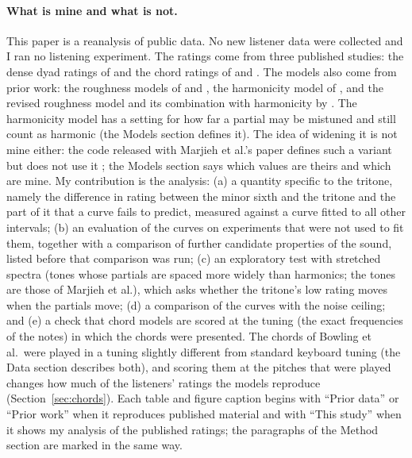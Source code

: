 \documentclass[11pt,a4paper]{article}
\begin{document}
\paragraph{What is mine and what is not.}
This paper is a reanalysis of public data. No new listener data were collected and I ran no
listening experiment. The ratings come from three published studies: the dense dyad ratings of
\citet{marjieh2024} and the chord ratings of \citet{bowling2018} and \citet{johnsonlaird2012}.
The models also come from prior work: the roughness models of \citet{hutchinson1978} and
\citet{sethares1993}, the harmonicity model of \citet{harrison2018,harrison2020}, and the
revised roughness model and its combination with harmonicity by \citet{marjieh2024}. The harmonicity model has a setting for how far a partial may be mistuned and still count
as harmonic (the Models section defines it). The idea of widening it is not
mine either: the code
released with Marjieh et al.'s paper defines such a variant but does not use it
\citep{marjieh2024code}; the Models section says which values are theirs and which are mine. My contribution is the
analysis: (a) a quantity specific to the tritone, namely the difference in rating between the
minor sixth and the tritone and the part of it that a curve fails to predict, measured against
a curve fitted to all other intervals; (b) an evaluation of the curves on experiments that
were not used to fit them, together with a comparison of further candidate properties of the sound, listed before that comparison was run; (c) an exploratory test with stretched spectra (tones whose partials are spaced more widely than harmonics; the tones are those of Marjieh et al.), which asks
whether the tritone's low rating moves when the partials move; (d) a comparison of the curves with the noise ceiling; and (e) a check that chord models are scored at the
tuning (the exact frequencies of the notes) in which the chords were presented. The chords of
Bowling et al.\ were played in a tuning slightly different from standard keyboard tuning (the
Data section describes both), and scoring them at the pitches that were played changes how
much of the listeners' ratings the models reproduce (Section~\ref{sec:chords}). Each table and figure caption
begins with ``Prior data'' or ``Prior work'' when it reproduces published material and with ``This study'' when
it shows my analysis of the published ratings; the paragraphs of the Method section are
marked in the same way.

\end{document}
